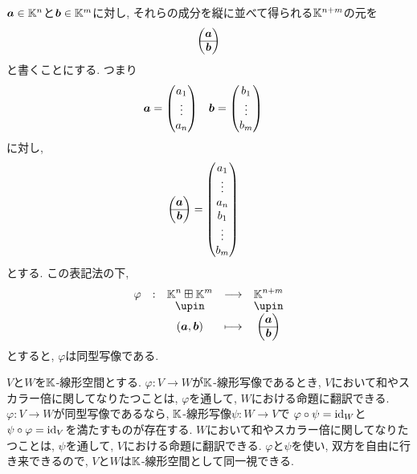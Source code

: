 \begin{example}
  $\boldsymbol{a}\in\mathbb{K}^n$と$\boldsymbol{b}\in \mathbb{K}^m$に対し,
  それらの成分を縦に並べて得られる$\mathbb{K}^{n+m}$の元を
  \begin{align*}
      \begin{pmatrix}
      \boldsymbol{a}\\\hline
      \boldsymbol{b}
      \end{pmatrix}
  \end{align*}
  と書くことにする. つまり
  \begin{align*}
    \boldsymbol{a}&=\begin{pmatrix}a_1\\\vdots\\a_n\end{pmatrix}
   & \boldsymbol{b}&=\begin{pmatrix}b_1\\\vdots\\b_m\end{pmatrix}
  \end{align*}
  に対し,
  \begin{align*}
    \begin{pmatrix}
      \boldsymbol{a}\\\hline
      \boldsymbol{b}
      \end{pmatrix}
   &=\begin{pmatrix}a_1\\\vdots\\a_n\\b_1\\\vdots\\b_m\end{pmatrix}
  \end{align*}
  とする.
  この表記法の下,
  \begin{align*}
    \shazo{\varphi}{\KK^n\boxplus\KK^m}{\KK^{n+m}}
          {(\aaa,\bbb)}{\begin{pmatrix}\aaa\\\hline\bbb\end{pmatrix}}
  \end{align*}
  とすると, $\varphi$は同型写像である.
\end{example}


\begin{remark}
  $V$と$W$を$\mathbb{K}$-線形空間とする.
  $\varphi\colon V\to W$が$\mathbb{K}$-線形写像であるとき,
  $V$において和やスカラー倍に関してなりたつことは,
  $\varphi$を通して, $W$における命題に翻訳できる.
  $\varphi\colon V\to W$が同型写像であるなら,
  $\mathbb{K}$-線形写像$\psi\colon W\to V$で
  $\varphi\circ \psi=\operatorname{id}_W$と
  $\psi\circ \varphi=\operatorname{id}_V$を満たすものが存在する.
  $W$において和やスカラー倍に関してなりたつことは,
  $\psi$を通して, $V$における命題に翻訳できる.
  $\varphi$と$\psi$を使い, 双方を自由に行き来できるので,
  $V$と$W$は$\mathbb{K}$-線形空間として同一視できる.
\end{remark}

